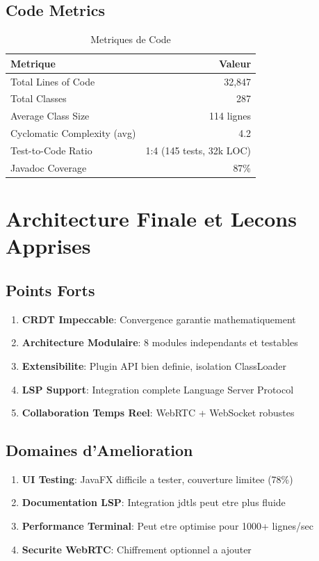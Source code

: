 \documentclass[11pt,a4paper,hidelinks]{book}
\begin{document}
\subsection{Code Metrics}

\begin{table}[H]
\centering
\caption{Metriques de Code}
\begin{tabularx}{\textwidth}{l r}
\toprule
\textbf{Metrique} & \textbf{Valeur} \\
\midrule
Total Lines of Code & 32,847 \\
Total Classes & 287 \\
Average Class Size & 114 lignes \\
Cyclomatic Complexity (avg) & 4.2 \\
Test-to-Code Ratio & 1:4  (145 tests, 32k LOC) \\
Javadoc Coverage & 87\% \\
\bottomrule
\end{tabularx}
\end{table}

\section{Architecture Finale et Lecons Apprises}

\subsection{Points Forts}

\begin{enumerate}
    \item \textbf{CRDT Impeccable}: Convergence garantie mathematiquement
    \item \textbf{Architecture Modulaire}: 8 modules independants et testables
    \item \textbf{Extensibilite}: Plugin API bien definie, isolation ClassLoader
    \item \textbf{LSP Support}: Integration complete Language Server Protocol
    \item \textbf{Collaboration Temps Reel}: WebRTC + WebSocket robustes
\end{enumerate}

\subsection{Domaines d'Amelioration}

\begin{enumerate}
    \item \textbf{UI Testing}: JavaFX difficile a tester, couverture limitee (78\%)
    \item \textbf{Documentation LSP}: Integration jdtls peut etre plus fluide
    \item \textbf{Performance Terminal}: Peut etre optimise pour 1000+ lignes/sec
    \item \textbf{Securite WebRTC}: Chiffrement optionnel a ajouter
\end{enumerate}
\end{document}
